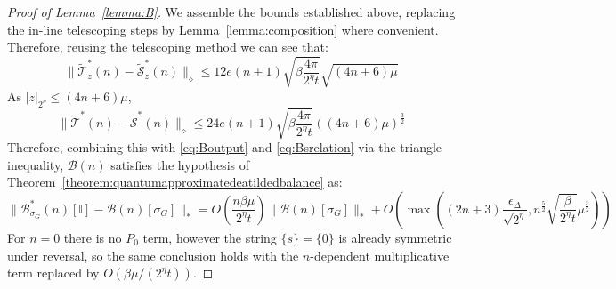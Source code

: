 \documentclass[aps,floatfix,10pt,amssymb,amsfont,amsmath,superscriptaddress,float,nofootinbib,longbibliography,nobalancelastpage,twocolumn]{revtex4-2}
\begin{document}
\begin{proof}[Proof of Lemma~\ref{lemma:B}]
We assemble the bounds established above, replacing the in-line telescoping steps by Lemma~\ref{lemma:composition} where convenient.
Therefore, reusing the telescoping method we can see that:
\begin{equation}
    \|\tilde{\mathcal{T}}_z^*(n) - \tilde{\mathcal{S}}_z^*(n)\|_{\diamond} \leq 12e(n+1)\sqrt{\beta\frac{4\pi}{2^{\eta}t}}\sqrt{(4n+6)\mu}
\end{equation}
As $|z|_{2^{\eta}} \leq (4n+6)\mu$,
\begin{equation}
    \|\tilde{\mathcal{T}}^*(n) - \tilde{\mathcal{S}}^*(n)\|_{\diamond} \leq 24e(n+1)\sqrt{\beta\frac{4\pi}{2^{\eta}t}}((4n+6)\mu)^{\frac{3}{2}}
\end{equation}
Therefore, combining this with \eqref{eq:Boutput} and \eqref{eq:Bsrelation} via the triangle inequality, $\mathcal{B}(n)$ satisfies the hypothesis of Theorem~\ref{theorem:quantumapproximatedeatildedbalance} as:
\begin{equation}
    \|\mathcal{B}^*_{\sigma_G}(n)[\mathbb{I}] - \mathcal{B}(n)[\sigma_G]\|_* = O\left(\frac{n\beta\mu}{2^{\eta}t} \right)\|\mathcal{B}(n)[\sigma_G]\|_* +O\left(\max\left((2n+3)\frac{\epsilon_{\Delta}}{\sqrt{2^{\eta}}},n^{\frac{5}{2}}\sqrt{\frac{\beta }{2^{\eta}t}}\mu^{\frac{3}{2}}\right)\right) 
\end{equation}
For $n=0$ there is no $P_0$ term, however the string $\{s\} =\{0\}$ is already symmetric under reversal, so the same conclusion holds with the $n$-dependent multiplicative term replaced by $O(\beta\mu/(2^{\eta}t))$.
\end{proof}
\clearpage
\end{document}
